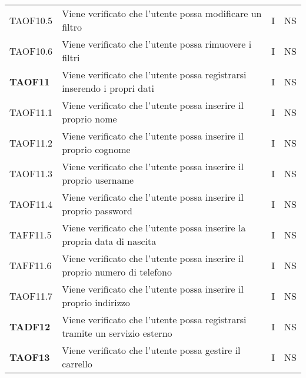 \begin{center}
\begin{longtable}[!h]{p{60px} p{240px} p{35px} p{35px}}
        TAOF10.5        & Viene verificato che l'utente possa modificare un filtro                                                             & I             & NS              \\
        TAOF10.6        & Viene verificato che l'utente possa rimuovere i filtri                                                               & I             & NS              \\
        \textbf{TAOF11} & Viene verificato che l'utente possa registrarsi inserendo i propri dati                                              & I             & NS              \\
        TAOF11.1        & Viene verificato che l'utente possa inserire il proprio nome                                                         & I             & NS              \\
        TAOF11.2        & Viene verificato che l'utente possa inserire il proprio cognome                                                      & I             & NS              \\
        TAOF11.3        & Viene verificato che l'utente possa inserire il proprio username                                                     & I             & NS              \\
        TAOF11.4        & Viene verificato che l'utente possa inserire il proprio password                                                     & I             & NS              \\
        TAFF11.5        & Viene verificato che l'utente possa inserire la propria data di nascita                                              & I             & NS              \\
        TAFF11.6        & Viene verificato che l'utente possa inserire il proprio numero di telefono                                           & I             & NS              \\
        TAOF11.7        & Viene verificato che l'utente possa inserire il proprio indirizzo                                                    & I             & NS              \\
        \textbf{TADF12} & Viene verificato che l'utente possa registrarsi tramite un servizio esterno                                          & I             & NS              \\
        \textbf{TAOF13} & Viene verificato che l'utente possa gestire il carrello                                                              & I             & NS              \\

\end{longtable}
\end{center}
